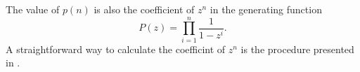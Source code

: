The value of $p(n)$ is also the coefficient of $z^n$ in the generating
function
\[
P(z)
=
\prod_{i=1}^n
\frac{
  1
}{
  1 - z^i
}.
\]
A straightforward way to calculate the coefficint of $z^n$ is the
procedure presented in .

\begin{algorithm}[!htbp]

\caption{%
  The number of ways to partition $n$.
}
\label{alg:sum:recurrence_relation}
\end{algorithm}
